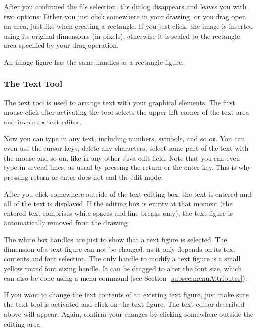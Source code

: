 
After you confirmed the file selection, the dialog disappears and leaves you
with two options: Either you just click somewhere in your drawing, or you drag
open an area, just like when creating a rectangle. If you just click, the image
is inserted using its original dimensions (in pixels), otherwise it is scaled
to the rectangle area specified by your drag operation.

An image figure has the same handles as a rectangle figure.



\subsubsection{The Text Tool}
\label{subsubsec:toolText}

The text tool is used to arrange text with your graphical elements.
The first mouse click after activating the tool selects the upper left corner
of the text area and invokes a text editor.

Now you can type in any text,
including numbers, symbols, and so on. You can even use the cursor keys,
delete any characters, select some part of the text with the mouse and so on,
like in any other Java edit field.
Note that you can even type in several lines, as usual by pressing the return
or the enter key. This is why pressing return or enter does not end the edit
mode.

After you click somewhere outside of the text editing box, the text is entered
and all of the text is displayed.
If the editing box is empty at that moment (the entered text comprises white
spaces and line breaks only), the text figure is automatically removed from
the drawing.

The white box handles are just to show that a text figure is selected.
The dimension of a text figure can not be changed, as it only depends on its
text contents and font selection.
The only handle to modify a text figure is a small yellow round font sizing
handle.
It can be dragged to alter the font size, which can also be done using a menu
command (see Section~\ref{subsec:menuAttributes}). 

If you want to change the text contents of an existing text figure, just
make sure the text tool is activated and click on the text figure.
The text editor described above will appear.
Again, confirm your changes by clicking somewhere outside the editing area.

